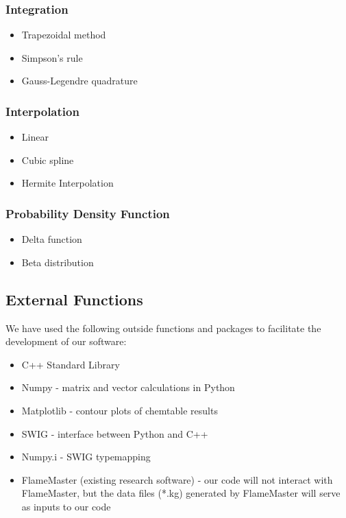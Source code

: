 \documentclass[11pt]{article}
\begin{document}
\subsubsection{Integration}
\begin{itemize}
\item Trapezoidal method
\item Simpson’s rule
\item Gauss-Legendre quadrature
\end{itemize}

\subsubsection{Interpolation}
\begin{itemize}
\item Linear
\item Cubic spline
\item Hermite Interpolation
\end{itemize}

\subsubsection{Probability Density Function}
\begin{itemize}
\item Delta function
\item Beta distribution
\end{itemize}


\subsection{External Functions}

We have used the following outside functions and packages to
facilitate the development of our software:
\begin{itemize} 
\item C++ Standard Library
\item Numpy - matrix and vector calculations in Python
\item Matplotlib - contour plots of chemtable results
\item SWIG - interface between Python and C++
\item Numpy.i - SWIG typemapping
\item FlameMaster (existing research software) - our code will not
  interact with FlameMaster, but the data files (*.kg) generated by
  FlameMaster will serve as inputs to our code
\end{itemize}
\end{document}
